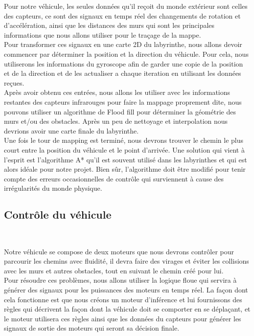    Pour notre véhicule, les seules données qu'il reçoit du monde extérieur sont
celles des capteurs, ce sont des signaux en temps réel des changements de
rotation et d'accélération, ainsi que les distances des murs qui sont les
principales informations que nous allons utiliser pour le traçage de la mappe. \\

   Pour transformer ces signaux en une carte 2D du labyrinthe, nous allons devoir
commencer par déterminer la position et la direction du véhicule. Pour cela,
nous utiliserons les informations du gyroscope afin de garder une copie de la
position et de la direction et de les actualiser a chaque iteration en
utilisant les données reçues. \\

   Après avoir obtenu ces entrées, nous allons les utiliser avec les informations
restantes des capteurs infrarouges pour faire la mappage proprement dite, nous
pouvons utiliser un algorithme de Flood fill pour déterminer la géométrie des
murs et/ou des obstacles. Après un peu de nettoyage et interpolation nous
devrions avoir une carte finale du labyrinthe. \\

   Une fois le tour de mapping est terminé, nous devrons trouver le chemin le plus
court entre la position du véhicule et le point d'arrivée. Une solution qui
vient à l'esprit est l'algorithme A* qu'il est souvent utilisé dans les
labyrinthes et qui est alors idéale pour notre projet. Bien sûr, l'algorithme
doit être modifié pour tenir compte des erreurs occasionnelles de contrôle qui
surviennent à cause des irrégularités du monde physique.

\subsection{Contrôle du véhicule} \label{sec:ctrlComm}

Notre véhicule se compose de deux moteurs que nous devrons contrôler pour
parcourir les chemins avec fluidité, il devra faire des virages et éviter les
collisions avec les murs et autres obstacles, tout en suivant le chemin créé
pour lui. \\

Pour résoudre ces problèmes, nous allons utiliser la logique floue qui servira
à générer des signaux pour les puissances des moteurs en temps réel. La façon
dont cela fonctionne est que nous créons un moteur d'inférence et lui
fournissons des règles qui décrivent la façon dont la véhicule doit se comporter 
en se déplaçant, et le moteur utilisera ces règles ainsi que les données du
capteurs pour générer les signaux de sortie des moteurs qui seront sa décision
finale.

